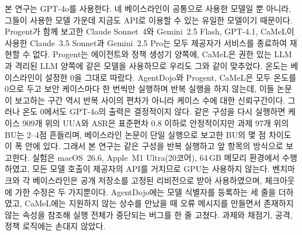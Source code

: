 \documentclass[acmsmall,screen,review,anonymous]{acmart}
\begin{document}
본 연구는 GPT-4o를 사용한다. 네 베이스라인이 공통으로 사용한 모델일 뿐 아니라, 그들이 사용한 모델 가운데 지금도 API로 이용할 수 있는 유일한 모델이기 때문이다. Progent가 함께 보고한 Claude Sonnet~4와 Gemini~2.5 Flash, GPT-4.1, CaMeL이 사용한 Claude~3.5 Sonnet과 Gemini~2.5 Pro는 모두 제공자가 서비스를 종료하여 재현할 수 없다. Progent는 에이전트와 정책 생성기 양쪽에, CaMeL은 권한 있는 LLM과 격리된 LLM 양쪽에 같은 모델을 사용하므로 우리도 그와 같이 맞추었다. 온도는 베이스라인이 설정한 0을 그대로 따랐다. AgentDojo와 Progent, CaMeL은 모두 온도를 0으로 두고 보안 케이스마다 한 번씩만 실행하며 반복 실행을 하지 않는데, 이들 논문이 보고하는 구간 역시 반복 사이의 편차가 아니라 케이스 수에 대한 신뢰구간이다. 그러나 온도 0에서도 GPT-4o의 출력은 결정적이지 않다. 같은 구성을 다시 실행하면 케이스 909개 위의 UUA와 ASR은 표준편차 0.8 이하로 안정적이지만 과제 97개 위의 BU는 2--4점 흔들리며, 베이스라인 논문이 단일 실행으로 보고한 BU의 몇 점 차이도 이 폭 안에 있다. 그래서 본 연구는 같은 구성을 반복 실행하고 앞 항목의 방식으로 보고한다. 실험은 macOS~26.6, Apple~M1 Ultra(20코어), 64\,GB 메모리 환경에서 수행하였고, 모든 모델 호출이 제공자의 API를 거치므로 GPU는 사용하지 않는다. 벤치마크와 각 베이스라인은 공개 저장소를 고정된 리비전으로 받아 사용하였으며, 체크아웃에 가한 수정은 두 가지뿐이다. AgentDojo에는 모델 식별자를 등록하는 세 줄을 더하였고, CaMeL에는 지원하지 않는 상수를 만났을 때 오류 메시지를 만들면서 존재하지 않는 속성을 참조해 실행 전체가 중단되는 버그를 한 줄 고쳤다. 과제와 채점기, 공격, 정책 로직에는 손대지 않았다.
\end{document}
